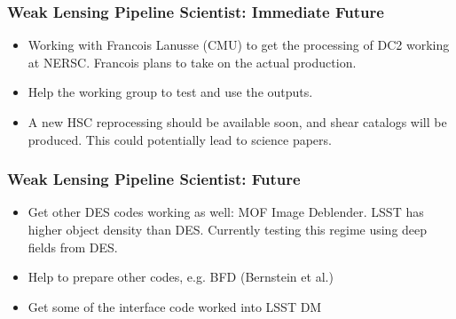 \documentclass[aspectratio=169]{beamer}
\begin{document}
\frame
{

    \frametitle{Weak Lensing Pipeline Scientist: Immediate Future}


    \begin{itemize}

        \item Working with Francois Lanusse (CMU) to get the processing
            of DC2 working at NERSC. Francois plans to take on the
            actual production.

        \item Help the working group to test and use the outputs.

        \item A new HSC reprocessing should be available soon, and
            shear catalogs will be produced.  This could 
            potentially lead to science papers.


    \end{itemize}
}

\frame
{

    \frametitle{Weak Lensing Pipeline Scientist: Future}


    \begin{itemize}

        \item Get other DES codes working as well: MOF Image Deblender.  LSST
            has higher object density than DES.  Currently testing this regime
            using deep fields from DES.

        \item Help to prepare other codes, e.g. BFD (Bernstein et al.)

        \item Get some of the interface code worked into LSST DM

    \end{itemize}
}
\end{document}
